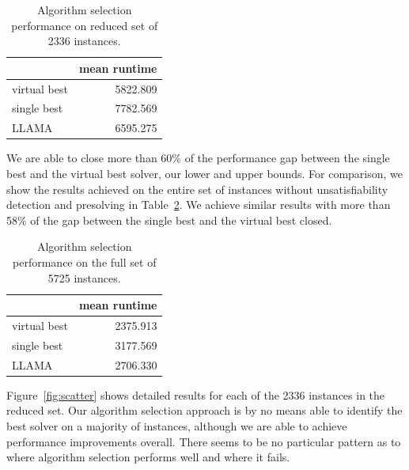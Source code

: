 \documentclass{llncs}
\begin{document}
\begin{table}[ht]
\centering
\begin{tabular}{lr}
  \toprule
& mean runtime\\
  \midrule
virtual best & 5822.809\\
  single best & 7782.569\\
  LLAMA & 6595.275\\
   \bottomrule
\end{tabular}
\vspace{1ex}
\caption{Algorithm selection performance on reduced set of 2336
instances.}\label{tab:res}
\end{table}

We are able to close more than 60\% of the performance gap between the single
best and the virtual best solver, our lower and upper bounds. For comparison, we
show the results achieved on the entire set of instances without
unsatisfiability detection and presolving in Table~\ref{tab:resfull}. We achieve
similar results with more than 58\% of the gap between the single best and the
virtual best closed.

\begin{table}[ht]
\centering
\begin{tabular}{lr}
  \toprule
& mean runtime\\
  \midrule
virtual best & 2375.913\\
  single best & 3177.569\\
  LLAMA & 2706.330\\
   \bottomrule
\end{tabular}
\vspace{1ex}
\caption{Algorithm selection performance on the full set of 5725
instances.}\label{tab:resfull}
\end{table}

Figure~\ref{fig:scatter} shows detailed results for each of the 2336 instances
in the reduced set. Our algorithm selection approach is by no means able to
identify the best solver on a majority of instances, although we are able to
achieve performance improvements overall. There seems to be no particular
pattern as to where algorithm selection performs well and where it fails.
\end{document}

